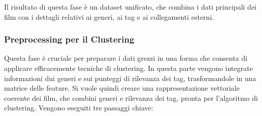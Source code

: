 \documentclass[a4paper,12pt]{article}
\begin{document}
	Il risultato di questa fase è un dataset unificato, che combina i dati principali dei film con i dettagli relativi ai generi, ai tag e ai collegamenti esterni.

        \subsubsection{Preprocessing per il Clustering}
		Questa fase è cruciale per preparare i dati grezzi in una forma che consenta di applicare efficacemente tecniche di clustering. In questa parte vengono integrate informazioni dui generi e sui punteggi di rilevanza dei tag, trasformandole in una matrice delle feature. Si vuole quindi creare una rappresentazione vettoriale coerente dei film, che combini generi e rilevanza dei tag, pronta per l'algoritmo di clustering. Vengono eseguiti tre passaggi chiave: 
\end{document}
